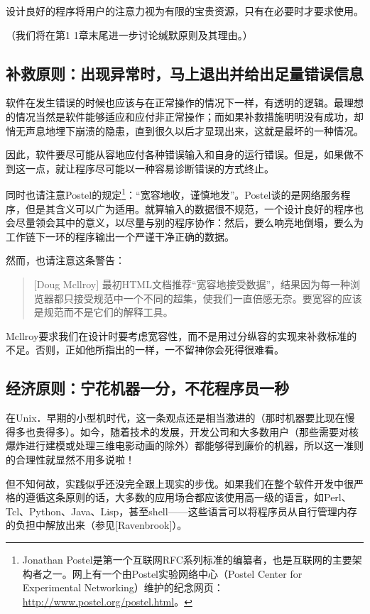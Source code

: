 \documentclass[11pt,oneside]{book}
\begin{document}
\begin{common-format}
设计良好的程序将用户的注意力视为有限的宝贵资源，只有在必要时才要求使用。

（我们将在第1 1章末尾进一步讨论缄默原则及其理由。）


\subsection{补救原则：出现异常时，马上退出并给出足量错误信息}
软件在发生错误的时候也应该与在正常操作的情况下一样，有透明的逻辑。最理想的情况当然是软件能够适应和应付非正常操作；而如果补救措施明明没有成功，却悄无声息地埋下崩溃的隐患，直到很久以后才显现出来，这就是最坏的一种情况。

因此，软件要尽可能从容地应付各种错误输入和自身的运行错误。但是，如果做不到这一点，就让程序尽可能以一种容易诊断错误的方式终止。

同时也请注意Postel的规定\footnote{Jonathan Postel是第一个互联网RFC系列标准的编纂者，也是互联网的主要架构者之一。网上有一个由Postel实验网络中心（Postel Center for Experimental Networking）维护的纪念网页：\href{http://www.postel.org/postel.html}{http://www.postel.org/postel.html}。}：“宽容地收，谨慎地发”。Postel谈的是网络服务程序，但是其含义可以广为适用。就算输入的数据很不规范，一个设计良好的程序也会尽量领会其中的意义，以尽量与别的程序协作：然后，要么响亮地倒塌，要么为工作链下一环的程序输出一个严谨干净正确的数据。

然而，也请注意这条警告：

\begin{quote}[Doug Mcllroy]
最初HTML文档推荐“宽容地接受数据”，结果因为每一种浏览器都只接受规范中一个不同的超集，使我们一直倍感无奈。要宽容的应该是规范而不是它们的解释工具。
\end{quote}

Mcllroy要求我们在设计时要考虑宽容性，而不是用过分纵容的实现来补救标准的不足。否则，正如他所指出的一样，一不留神你会死得很难看。

\subsection{经济原则：宁花机器一分，不花程序员一秒}
在Unix．早期的小型机时代，这一条观点还是相当激进的（那时机器要比现在慢得多也贵得多）。如今，随着技术的发展，开发公司和大多数用户（那些需要对核爆炸进行建模或处理三维电影动画的除外）都能够得到廉价的机器，所以这一准则的合理性就显然不用多说啦！

但不知何故，实践似乎还没完全跟上现实的步伐。如果我们在整个软件开发中很严格的遵循这条原则的话，大多数的应用场合都应该使用高一级的语言，如Perl、Tcl、Python、Java、Lisp，甚至shell——这些语言可以将程序员从自行管理内存的负担中解放出来（参见[Ravenbrook]）。


\end{common-format}
\end{document}
